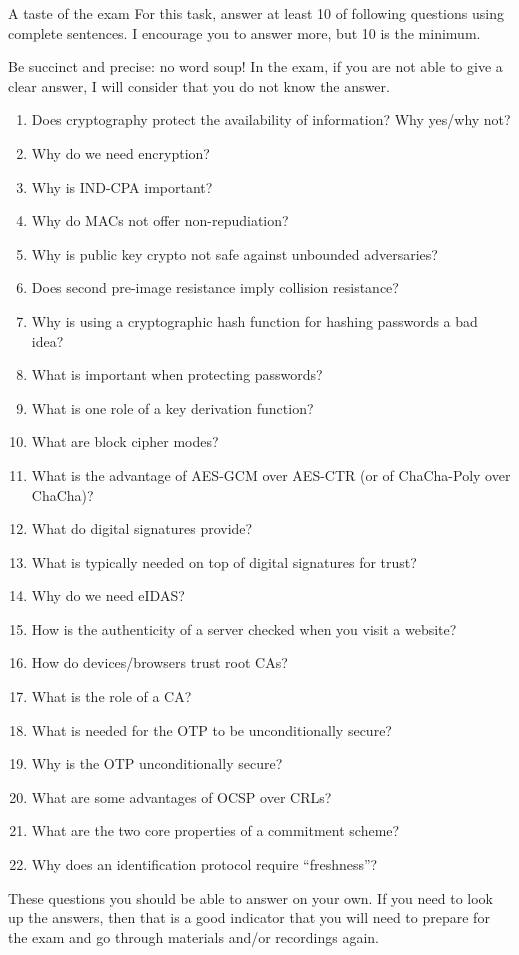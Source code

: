 \documentclass{homework}
\begin{document}
\begin{task}{A taste of the exam}
  For this task, answer at least 10 of following questions using complete sentences.
  I encourage you to answer more, but 10 is the minimum.

  Be succinct and precise: no word soup!
  In the exam, if you are not able to give a clear answer, I will consider that you do not know the answer.

  \begin{enumerate}
    \item Does cryptography protect the availability of information?
    Why yes/why not?
    \item Why do we need encryption?
    \item Why is IND-CPA important?
    \item Why do MACs not offer non-repudiation?
    \item Why is public key crypto not safe against unbounded adversaries?
    \item Does second pre-image resistance imply collision resistance?
    \item Why is using a cryptographic hash function for hashing passwords a bad idea?
    \item What is important when protecting passwords?
    \item What is one role of a key derivation function?
    \item What are block cipher modes?
    \item What is the advantage of AES-GCM over AES-CTR (or of ChaCha-Poly over ChaCha)?
    \item What do digital signatures provide?
    \item What is typically needed on top of digital signatures for trust?
    \item Why do we need eIDAS?
    \item How is the authenticity of a server checked when you visit a website?
    \item How do devices/browsers trust root CAs?
    \item What is the role of a CA?
    \item What is needed for the OTP to be unconditionally secure?
    \item Why is the OTP unconditionally secure?
    \item What are some advantages of OCSP over CRLs?
    \item What are the two core properties of a commitment scheme?
    \item Why does an identification protocol require \enquote{freshness}?
  \end{enumerate}

  These questions you should be able to answer on your own.
  If you need to look up the answers, then that is a good indicator that you will need to prepare for the exam and go through materials and/or recordings again.
\end{task}
\end{document}
